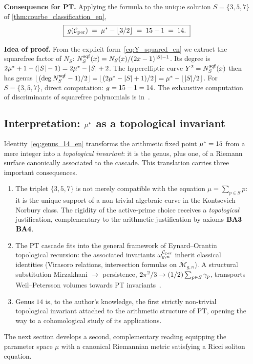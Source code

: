 \textbf{Consequence for PT.} Applying the formula to the unique solution $S = \{3, 5, 7\}$ of \ref{thm:courbe_classification_en},
\begin{equation}
\boxed{\;g(\mathcal{C}_{\rm per}) \;=\; \mu^{*} - \lfloor 3/2 \rfloor \;=\; 15 - 1 \;=\; 14.\;}
\label{eq:genus_14_en}
\end{equation}

\textbf{Idea of proof.} From the explicit form~\eqref{eq:Y_squared_en} we extract the squarefree factor of $N_S$: $N_S^{\rm sqf}(x) = N_S(x)/(2x - 1)^{|S| - 1}$. Its degree is $2\mu^{*} + 1 - (|S| - 1) = 2\mu^{*} - |S| + 2$. The hyperelliptic curve $Y^{2} = N_S^{\rm sqf}(x)$ then has genus $\lfloor (\deg N_S^{\rm sqf} - 1)/2 \rfloor = \lfloor (2\mu^{*} - |S| + 1)/2 \rfloor = \mu^{*} - \lfloor |S|/2 \rfloor$. For $S = \{3, 5, 7\}$, direct computation: $g = 15 - 1 = 14$. The exhaustive computation of discriminants of squarefree polynomials is in~\cite[\S 7]{PT_GeoFlow_PersistenceCurve}.

\subsection{Interpretation: \texorpdfstring{$\mu^{*}$}{μ*} as a topological invariant}
\label{sec:courbe:interpretation}

Identity~\eqref{eq:genus_14_en} transforms the arithmetic fixed point $\mu^{*} = 15$ from a mere integer into a \emph{topological invariant}: it is the genus, plus one, of a Riemann surface canonically associated to the cascade. This translation carries three important consequences.

\begin{enumerate}[nosep,leftmargin=*]
\item The triplet $\{3, 5, 7\}$ is not merely compatible with the equation $\mu = \sum_{p \in S} p$: it is the unique support of a non-trivial algebraic curve in the Kontsevich--Norbury class. The rigidity of the active-prime choice receives a \emph{topological} justification, complementary to the arithmetic justification by axioms $\textbf{BA3}$--$\textbf{BA4}$.
\item The PT cascade fits into the general framework of Eynard--Orantin topological recursion: the associated invariants $\omega_{g,n}^{\mathcal{C}_{\rm per}}$ inherit classical identities (Virasoro relations, intersection formulas on $\overline{\mathcal M}_{g,n}$). A structural substitution Mirzakhani $\to$ persistence, $2\pi^{2}/3 \to (1/2) \sum_{p \in S} \gamma_{p}$, transports Weil--Petersson volumes towards PT invariants~\cite[\S 8]{PT_GeoFlow_PersistenceCurve}.
\item Genus $14$ is, to the author's knowledge, the first strictly non-trivial topological invariant attached to the arithmetic structure of PT, opening the way to a cohomological study of its applications.
\end{enumerate}
The next section develops a second, complementary reading equipping the parameter space $\mu$ with a canonical Riemannian metric satisfying a Ricci soliton equation.
